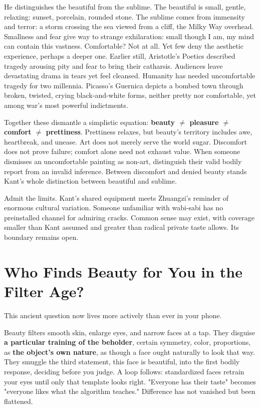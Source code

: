 He distinguishes the beautiful from the sublime. The beautiful is small, gentle, relaxing: sunset, porcelain, rounded stone. The sublime comes from immensity and terror: a storm crossing the sea viewed from a cliff, the Milky Way overhead. Smallness and fear give way to strange exhilaration: small though I am, my mind can contain this vastness. Comfortable? Not at all. Yet few deny the aesthetic experience, perhaps a deeper one. Earlier still, Aristotle's Poetics described tragedy arousing pity and fear to bring their catharsis. Audiences leave devastating drama in tears yet feel cleansed. Humanity has needed uncomfortable tragedy for two millennia. Picasso's Guernica depicts a bombed town through broken, twisted, crying black-and-white forms, neither pretty nor comfortable, yet among war's most powerful indictments.

Together these dismantle a simplistic equation: \textbf{beauty \ensuremath{\ne} pleasure \ensuremath{\ne} comfort \ensuremath{\ne} prettiness}. Prettiness relaxes, but beauty's territory includes awe, heartbreak, and unease. Art does not merely serve the world sugar. Discomfort does not prove failure; comfort alone need not exhaust value. When someone dismisses an uncomfortable painting as non-art, distinguish their valid bodily report from an invalid inference. Between discomfort and denied beauty stands Kant's whole distinction between beautiful and sublime.

Admit the limits. Kant's shared equipment meets Zhuangzi's reminder of enormous cultural variation. Someone unfamiliar with wabi-sabi has no preinstalled channel for admiring cracks. Common sense may exist, with coverage smaller than Kant assumed and greater than radical private taste allows. Its boundary remains open.

\section{Who Finds Beauty for You in the Filter Age?}
This ancient question now lives more actively than ever in your phone.

Beauty filters smooth skin, enlarge eyes, and narrow faces at a tap. They disguise \textbf{a particular training of the beholder}, certain symmetry, color, proportions, as \textbf{the object's own nature}, as though a face ought naturally to look that way. They smuggle the third statement, this face is beautiful, into the first bodily response, deciding before you judge. A loop follows: standardized faces retrain your eyes until only that template looks right. "Everyone has their taste" becomes "everyone likes what the algorithm teaches." Difference has not vanished but been flattened.

